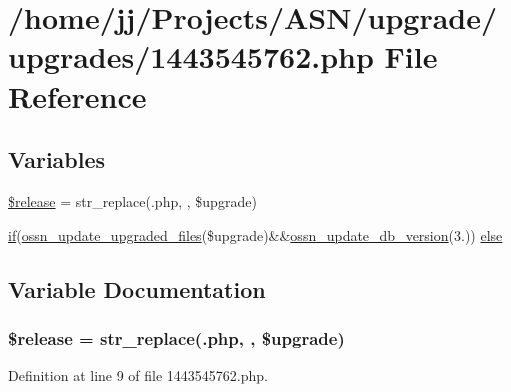 \hypertarget{1443545762_8php}{}\section{/home/jj/\+Projects/\+A\+S\+N/upgrade/upgrades/1443545762.php File Reference}
\label{1443545762_8php}
\subsection*{Variables}
\begin{DoxyCompactItemize}
\item 
\hyperlink{1443545762_8php_a63c5d6a8a9f1768ea926cee666dc991b}{\$release} = str\+\_\+replace(\textquotesingle{}.php\textquotesingle{}, \textquotesingle{}\textquotesingle{}, \$upgrade)
\item 
\hyperlink{jquery_8tokeninput_8js_ad8dd46a3cbc004569e34401e9e71771a}{if}(\hyperlink{ossn_8lib_8upgrade_8php_af5e235e44fa65a589d768b2693399250}{ossn\+\_\+update\+\_\+upgraded\+\_\+files}(\$upgrade)\&\&\hyperlink{ossn_8lib_8upgrade_8php_aa7120e10a9c14b722b0e25c99bc86d92}{ossn\+\_\+update\+\_\+db\+\_\+version}(\textquotesingle{}3.\textquotesingle{})) \hyperlink{1443545762_8php_a6cec0cc364d0724590fea6b8abc37e2b}{else}
\end{DoxyCompactItemize}


\subsection{Variable Documentation}
\subsubsection[{\texorpdfstring{\$release}{$release}}]{\setlength{\rightskip}{0pt plus 5cm}\$release = str\+\_\+replace(\textquotesingle{}.php\textquotesingle{}, \textquotesingle{}\textquotesingle{}, \$upgrade)}\hypertarget{1443545762_8php_a63c5d6a8a9f1768ea926cee666dc991b}{}\label{1443545762_8php_a63c5d6a8a9f1768ea926cee666dc991b}


Definition at line 9 of file 1443545762.\+php.

